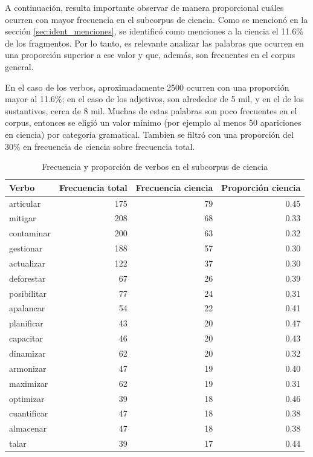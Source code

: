 \documentclass[11pt,a4paper]{article}
\begin{document}
A continuación, resulta importante observar de manera proporcional cuáles ocurren con mayor frecuencia en el subcorpus de ciencia. Como se mencionó en la sección \ref{sec:ident_menciones}, se identificó como menciones a la ciencia el 11.6\% de los fragmentos. Por lo tanto, es relevante analizar las palabras que ocurren en una proporción superior a ese valor y que, además, son frecuentes en el corpus general.

En el caso de los verbos, aproximadamente 2500 ocurren con una proporción mayor al 11.6\%; en el caso de los adjetivos, son alrededor de 5 mil, y en el de los sustantivos, cerca de 8 mil. Muchas de estas palabras son poco frecuentes en el corpus, entonces se eligió un valor mínimo (por ejemplo al menos 50 apariciones en ciencia) por categoría gramatical. Tambien se filtró con una proporción del 30\% en frecuencia de ciencia sobre frecuencia total.

\begin{table}[H]
	\centering
	\begin{tabular}{lrrr}
		\toprule
		\textbf{Verbo} & \textbf{Frecuencia total} & \textbf{Frecuencia ciencia} & \textbf{Proporción ciencia} \\
		\midrule
		articular     & 175 & 79 & 0.45 \\
		mitigar       & 208 & 68 & 0.33 \\
		contaminar    & 200 & 63 & 0.32 \\
		gestionar     & 188 & 57 & 0.30 \\
		actualizar    & 122 & 37 & 0.30 \\
		deforestar    & 67  & 26 & 0.39 \\
		posibilitar   & 77  & 24 & 0.31 \\
		apalancar     & 54  & 22 & 0.41 \\
		planificar    & 43  & 20 & 0.47 \\
		capacitar     & 46  & 20 & 0.43 \\
		dinamizar     & 62  & 20 & 0.32 \\
		armonizar     & 47  & 19 & 0.40 \\
		maximizar     & 62  & 19 & 0.31 \\
		optimizar     & 39  & 18 & 0.46 \\
		cuantificar   & 47  & 18 & 0.38 \\
		almacenar     & 47  & 18 & 0.38 \\
		talar         & 39  & 17 & 0.44 \\
		\bottomrule
	\end{tabular}
	\caption{Frecuencia y proporción de verbos en el subcorpus de ciencia}
	\label{tab:verbos_ciencia}
\end{table}
\end{document}
